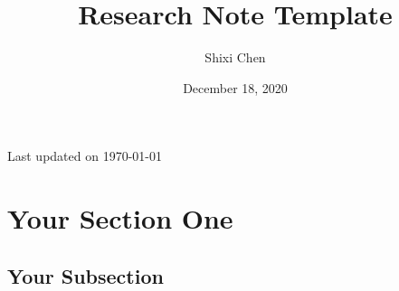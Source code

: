 \documentclass[11pt]{article}
\title{Research Note Template}
\author{Shixi Chen}
\date{December 18, 2020}
\newcommand{\updateinfo}[1][\today]{\par\vfill\hfill{\scriptsize\color{gray}Last updated on #1}}
\begin{document}
\maketitle


{}
\tableofcontents
\updateinfo

\newpage
\section{Your Section One}

\blindtext

\subsection{Your Subsection}
\end{document}
